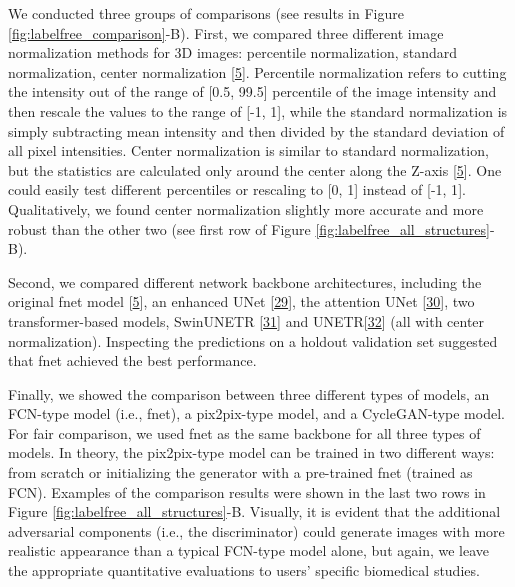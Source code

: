 We conducted three groups of comparisons (see results in Figure \ref{fig:labelfree_comparison}-B). First, we compared three different image normalization methods for 3D images: percentile normalization, standard normalization, center normalization {[}\protect\hyperlink{ref-Yq8wZ6hc}{5}{]}. Percentile normalization refers to cutting the intensity out of the range of {[}0.5, 99.5{]} percentile of the image intensity and then rescale the values to the range of {[}-1, 1{]}, while the standard normalization is simply subtracting mean intensity and then divided by the standard deviation of all pixel intensities. Center normalization is similar to standard normalization, but the statistics are calculated only around the center along the Z-axis {[}\protect\hyperlink{ref-Yq8wZ6hc}{5}{]}. One could easily test different percentiles or rescaling to {[}0, 1{]} instead of {[}-1, 1{]}. Qualitatively, we found center normalization slightly more accurate and more robust than the other two (see first row of Figure \ref{fig:labelfree_all_structures}-B).

Second, we compared different network backbone architectures, including the original fnet model {[}\protect\hyperlink{ref-Yq8wZ6hc}{5}{]}, an enhanced UNet {[}\protect\hyperlink{ref-M7480NLD}{29}{]}, the attention UNet {[}\protect\hyperlink{ref-OCow1hly}{30}{]}, two transformer-based models, SwinUNETR {[}\protect\hyperlink{ref-ZWL3IrVc}{31}{]} and UNETR{[}\protect\hyperlink{ref-XCKUntOB}{32}{]} (all with center normalization). Inspecting the predictions on a holdout validation set suggested that fnet achieved the best performance.

Finally, we showed the comparison between three different types of models, an FCN-type model (i.e., fnet), a pix2pix-type model, and a CycleGAN-type model. For fair comparison, we used fnet as the same backbone for all three types of models. In theory, the pix2pix-type model can be trained in two different ways: from scratch or initializing the generator with a pre-trained fnet (trained as FCN). Examples of the comparison results were shown in the last two rows in Figure \ref{fig:labelfree_all_structures}-B. Visually, it is evident that the additional adversarial components (i.e., the discriminator) could generate images with more realistic appearance than a typical FCN-type model alone, but again, we leave the appropriate quantitative evaluations to users' specific biomedical studies.

